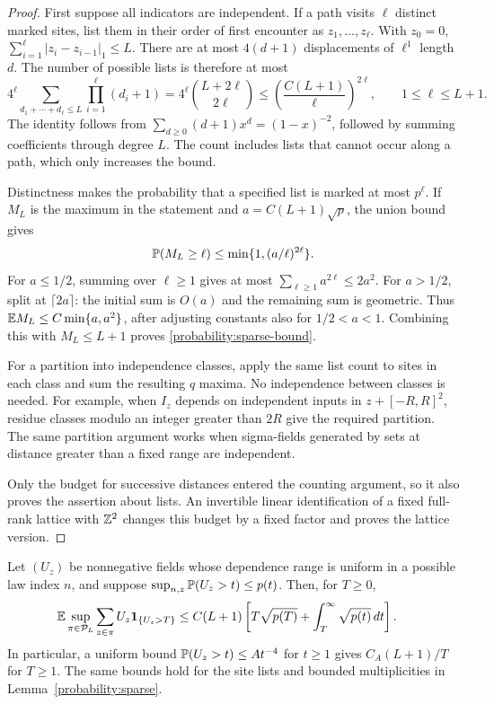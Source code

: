 \begin{proof}
First suppose all indicators are independent.  If a path visits
$\ell$ distinct marked sites, list them in their order of first
encounter as $z_1,\ldots,z_\ell$.  With $z_0=0$,
$\sum_{i=1}^{\ell}|z_i-z_{i-1}|_1\le L$.  There are at most
$4(d+1)$ displacements of $\ell^1$ length $d$.  The number of
possible lists is therefore at most
\[
 4^\ell\sum_{d_1+\cdots+d_\ell\le L}
                   \prod_{i=1}^{\ell}(d_i+1)
 =4^\ell\binom{L+2\ell}{2\ell}
 \le \left(\frac{C(L+1)}{\ell}\right)^{2\ell},
 \qquad 1\le\ell\le L+1.
\]
The identity follows from
$\sum_{d\ge0}(d+1)x^d=(1-x)^{-2}$, followed by summing
coefficients through degree $L$.  The count includes lists that
cannot occur along a path, which only increases the bound.

Distinctness makes the probability that a specified list is marked
at most $p^\ell$.  If $M_L$ is the maximum in the statement and
$a=C(L+1)\sqrt p$, the union bound gives
\begin{equation}
 \mathbb P(M_L\ge\ell)
 \le\min\{1,(a/\ell)^{2\ell}\}.
 \label{probability:sparse-union}
\end{equation}
For $a\le1/2$, summing over $\ell\ge1$ gives at most
$\sum_{\ell\ge1}a^{2\ell}\le2a^2$.  For $a>1/2$, split at
$\lceil2a\rceil$: the initial sum is $O(a)$ and the remaining
sum is geometric.  Thus $\mathbb E M_L\le C\min\{a,a^2\}$, after
adjusting constants also for $1/2<a<1$.  Combining this with
$M_L\le L+1$ proves \eqref{probability:sparse-bound}.

For a partition into independence classes, apply the same list
count to sites in each class and sum the resulting $q$ maxima.
No independence between classes is needed.  For example, when
$I_z$ depends on independent inputs in $z+[-R,R]^2$, residue
classes modulo an integer greater than $2R$ give the required
partition.  The same partition argument works when sigma-fields
generated by sets at distance greater than a fixed range are
independent.

Only the budget for successive distances entered the counting
argument, so it also proves the assertion about lists.  An invertible
linear identification of a fixed full-rank lattice with $\mathbb Z^2$
changes this budget by a fixed factor and proves the lattice version.
\end{proof}

\begin{corollary}
\label{probability:integrated-tails}
Let $(U_z)$ be nonnegative fields whose dependence range is uniform
in a possible law index $n$, and suppose
$\sup_{n,z}\mathbb P(U_z>t)\le p(t)$.  Then, for $T\ge0$,
\begin{align}
 \mathbb E\sup_{\pi\in\mathcal P_L}
       \sum_{z\in\pi}U_z\mathbf1_{\{U_z>T\}}
 &\le C(L+1)\left[T\sqrt{p(T)}+
                         \int_T^\infty\sqrt{p(t)}\,dt\right].
 \label{probability:tail-integral}
\end{align}
In particular, a uniform bound $\mathbb P(U_z>t)\le A t^{-4}$ for
$t\ge1$ gives $C_A(L+1)/T$ for $T\ge1$.  The same bounds hold
for the site lists and bounded multiplicities in
Lemma~\ref{probability:sparse}.
\end{corollary}

